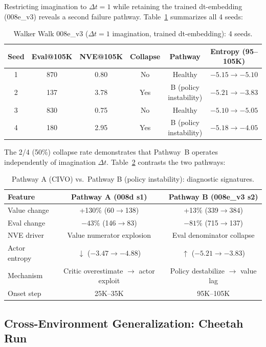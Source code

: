 \documentclass[10pt,letterpaper]{article}
\begin{document}
Restricting imagination to $\Delta t = 1$ while retaining the trained dt-embedding (008e\_v3) reveals a second failure pathway. Table~\ref{tab:dual_pathway} summarizes all 4 seeds:

\begin{table}[h]
\centering
\caption{Walker Walk 008e\_v3 ($\Delta t = 1$ imagination, trained dt-embedding): 4 seeds.}
\label{tab:dual_pathway}
\begin{tabular}{cccccc}
\toprule
Seed & Eval@105K & NVE@105K & Collapse & Pathway & Entropy (95--105K) \\
\midrule
1 & 870 & 0.80 & No  & Healthy & $-5.15 \to -5.10$ \\
2 & 137 & 3.78 & Yes & B (policy instability) & $-5.21 \to -3.83$ \\
3 & 830 & 0.75 & No  & Healthy & $-5.10 \to -5.05$ \\
4 & 180 & 2.95 & Yes & B (policy instability) & $-5.18 \to -4.05$ \\
\bottomrule
\end{tabular}
\end{table}

The 2/4 (50\%) collapse rate demonstrates that Pathway~B operates independently of imagination $\Delta t$. Table~\ref{tab:pathway_comparison} contrasts the two pathways:

\begin{table}[h]
\centering
\caption{Pathway A (CIVO) vs.\ Pathway B (policy instability): diagnostic signatures.}
\label{tab:pathway_comparison}
\begin{tabular}{lcc}
\toprule
Feature & Pathway A (008d s1) & Pathway B (008e\_v3 s2) \\
\midrule
Value change    & +130\% (60$\to$138) & +13\% (339$\to$384) \\
Eval change     & $-43$\% (146$\to$83)  & $-81$\% (715$\to$137) \\
NVE driver      & Value numerator explosion & Eval denominator collapse \\
Actor entropy   & $\downarrow$ ($-3.47\to-4.88$) & $\uparrow$ ($-5.21\to-3.83$) \\
Mechanism       & Critic overestimate $\to$ actor exploit & Policy destabilize $\to$ value lag \\
Onset step      & 25K--35K & 95K--105K \\
\bottomrule
\end{tabular}
\end{table}

\subsection{Cross-Environment Generalization: Cheetah Run}
\label{sec:cheetah}
\end{document}
